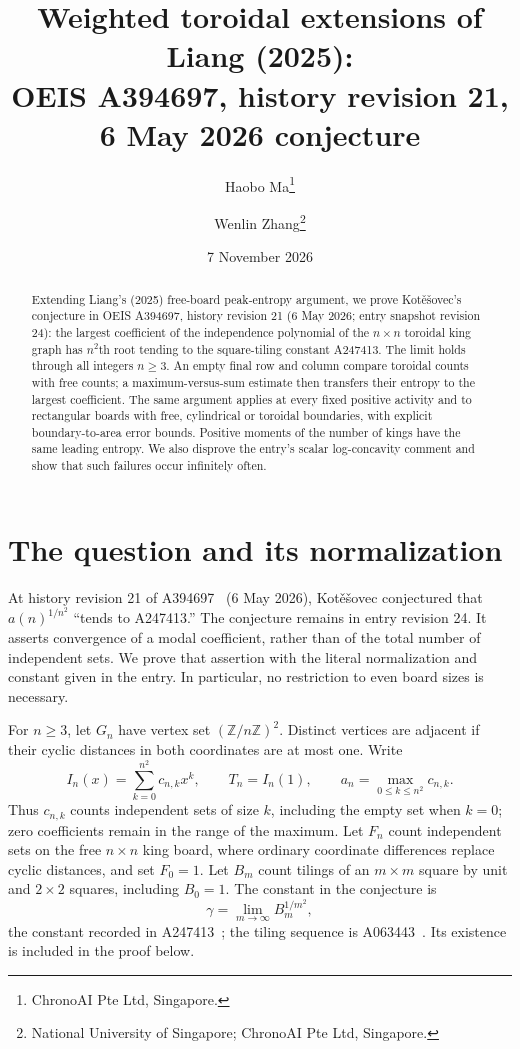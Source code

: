 \documentclass[10pt]{article}
\title{Weighted toroidal extensions of Liang (2025):\\
OEIS A394697, history revision 21,\\6 May 2026 conjecture}
\author{Haobo Ma\thanks{ChronoAI Pte Ltd, Singapore.}\and
Wenlin Zhang\thanks{National University of Singapore; ChronoAI Pte Ltd, Singapore.}}
\date{7 November 2026}
\newcommand{\gam}{\gamma}
\begin{document}
\maketitle
\begin{abstract}
Extending Liang's (2025) free-board peak-entropy argument, we prove
Kot\v{e}\v{s}ovec's conjecture in OEIS A394697, history revision 21
(6 May 2026; entry snapshot revision 24): the largest coefficient of the independence
polynomial of the $n\times n$ toroidal king graph has $n^2$th root tending
to the square-tiling constant A247413. The limit holds through all integers
$n\geq3$. An empty final row and column compare toroidal counts with free
counts; a maximum-versus-sum estimate then transfers their entropy to the
largest coefficient. The same
argument applies at every fixed positive activity and to rectangular
boards with free, cylindrical or toroidal boundaries, with explicit
boundary-to-area error bounds. Positive moments of the number of kings
have the same leading entropy. We also disprove the entry's scalar
log-concavity comment and show that such failures occur infinitely often.
\end{abstract}

\section{The question and its normalization}
At history revision 21 of A394697~\cite{a394697} (6 May 2026),
Kot\v{e}\v{s}ovec conjectured that $a(n)^{1/n^2}$ ``tends to A247413.''
The conjecture remains in entry revision 24. It asserts convergence of a modal
coefficient, rather than of the total number of independent sets. We prove
that assertion with the literal normalization and constant given in the
entry. In particular, no restriction to even board sizes is necessary.

For $n\geq3$, let $G_n$ have vertex set $(\mathbb Z/n\mathbb Z)^2$.
Distinct vertices are adjacent if their cyclic distances in both
coordinates are at most one. Write
\[
 I_n(x)=\sum_{k=0}^{n^2}c_{n,k}x^k,\qquad
 T_n=I_n(1),\qquad a_n=\max_{0\leq k\leq n^2}c_{n,k}.
\]
Thus $c_{n,k}$ counts independent sets of size $k$, including the empty
set when $k=0$; zero coefficients remain in the range of the maximum.
Let $F_n$ count independent sets on the free $n\times n$ king board,
where ordinary coordinate differences replace cyclic distances, and set
$F_0=1$. Let $B_m$ count tilings of an $m\times m$ square by unit and
$2\times2$ squares, including $B_0=1$. The constant in the conjecture is
\[
 \gam=\lim_{m\to\infty}B_m^{1/m^2},
 \tag{1}\label{constant}
\]
the constant recorded in A247413~\cite{a247413}; the tiling sequence is
A063443~\cite{a063443}. Its existence is included in the proof below.
\end{document}
